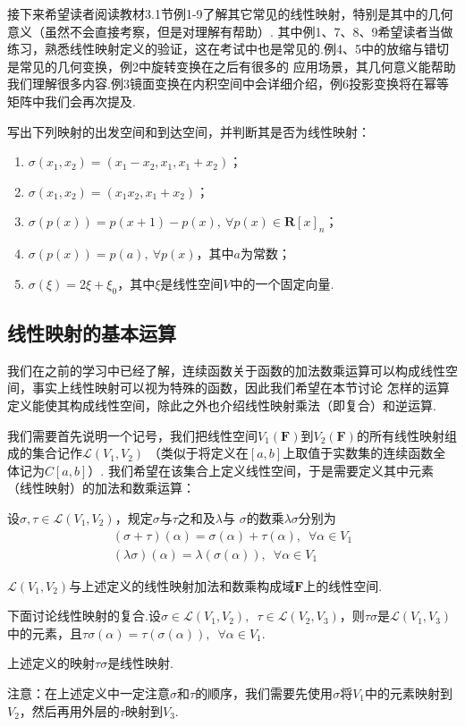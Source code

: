 接下来希望读者阅读教材3.1节例1-9了解其它常见的线性映射，特别是其中的几何意义（虽然不会直接考察，但是对理解有帮助）.
其中例1、7、8、9希望读者当做练习，熟悉线性映射定义的验证，这在考试中也是常见的.例4、5中的放缩与错切是常见的几何变换，例2中旋转变换在之后有很多的
应用场景，其几何意义能帮助我们理解很多内容.例3镜面变换在内积空间中会详细介绍，例6投影变换将在幂等矩阵中我们会再次提及.
\begin{example}
    写出下列映射的出发空间和到达空间，并判断其是否为线性映射：
    \begin{enumerate}[label=(\arabic*)]
        \item $\sigma(x_1,x_2)=(x_1-x_2,x_1,x_1+x_2)$；
        \item $\sigma(x_1,x_2)=(x_1x_2,x_1+x_2)$；
        \item $\sigma(p(x))=p(x+1)-p(x),\ \forall p(x) \in \mathbf{R}[x]_n$；
        \item $\sigma(p(x))=p(a),\ \forall p(x)$，其中$a$为常数；
        \item $\sigma(\xi)=2\xi+\xi_0$，其中$\xi$是线性空间$V$中的一个固定向量.
    \end{enumerate}
\end{example}

\subsection{线性映射的基本运算}
我们在之前的学习中已经了解，连续函数关于函数的加法数乘运算可以构成线性空间，事实上线性映射可以视为特殊的函数，因此我们希望在本节讨论
怎样的运算定义能使其构成线性空间，除此之外也介绍线性映射乘法（即复合）和逆运算.

我们需要首先说明一个记号，我们把线性空间$V_1(\mathbf{F})$到$V_2(\mathbf{F})$的所有线性映射组成的集合记作$\mathcal{L}(V_1,V_2)$
（类似于将定义在$[a,b]$上取值于实数集的连续函数全体记为$C[a,b]$）.
我们希望在该集合上定义线性空间，于是需要定义其中元素（线性映射）的加法和数乘运算：
\begin{definition}
    设$\sigma,\tau\in \mathcal{L}(V_1,V_2)$，规定$\sigma$与$\tau$之和及$\lambda$与
    $\sigma$的数乘$\lambda\sigma$分别为
    \begin{gather*}
        (\sigma+\tau)(\alpha)=\sigma(\alpha)+\tau(\alpha),\enspace\forall\alpha\in V_1 \\
        (\lambda\sigma)(\alpha)=\lambda(\sigma(\alpha)),\enspace\forall\alpha\in V_1
    \end{gather*}
\end{definition}
\begin{theorem}
    $\mathcal{L}(V_1,V_2)$与上述定义的线性映射加法和数乘构成域$\mathbf{F}$上的线性空间.
\end{theorem}
下面讨论线性映射的复合.设$\sigma \in \mathcal{L}(V_1,V_2),\enspace\tau \in \mathcal{L}(V_2,V_3)$，则$\tau\sigma$是$\mathcal{L}(V_1,V_3)$
中的元素，且$\tau\sigma(\alpha)=\tau(\sigma(\alpha)),\enspace\forall \alpha \in V_1$.
\begin{theorem}
    上述定义的映射$\tau\sigma$是线性映射.
\end{theorem}
注意：在上述定义中一定注意$\sigma$和$\tau$的顺序，我们需要先使用$\sigma$将$V_1$中的元素映射到
$V_2$，然后再用外层的$\tau$映射到$V_3$.

